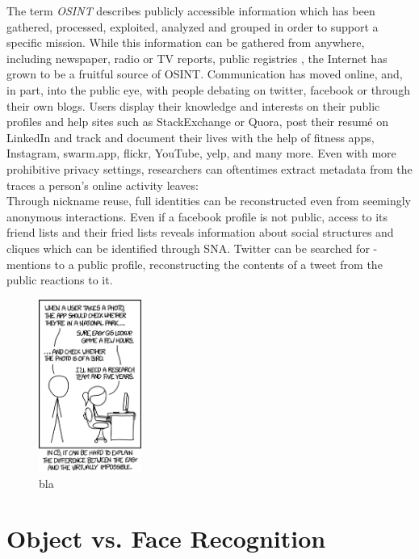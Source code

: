 \documentclass[twoside,a4paper]{article}
\begin{document}
The term \emph{\gls{OSINT}} describes publicly accessible information which has been gathered, processed, exploited, analyzed and grouped in order to support a specific mission.
While this information can be gathered from anywhere, including newspaper, radio or TV reports, public registries , the Internet has grown to be a fruitful source of OSINT. Communication has moved online, and, in part, into the public eye, with people debating on twitter, facebook or through their own blogs. Users display their knowledge and interests on their public profiles and help sites such as StackExchange or Quora, post their resumé on LinkedIn and track and document their lives with the help of fitness apps, Instagram, swarm.app, flickr, YouTube, yelp, and many more. Even with more prohibitive privacy settings, researchers can oftentimes extract metadata from the traces a person's online activity leaves:\\
Through nickname reuse, full identities can be reconstructed even from seemingly anonymous interactions. Even if a facebook profile is not public, access to its friend lists and their fried lists reveals information about social structures and cliques which can be identified through \gls{SNA}. Twitter can be searched for \@-mentions to a public profile, reconstructing the contents of a tweet from the public reactions to it.


\begin{figure}[h!]
\centering
    \includegraphics[width=0.3\textwidth]{images/xkcd}
\caption{bla}
\label{blubb}
\end{figure}

\section{Object vs. Face Recognition}
\label{sec:object_vs_face}






\newpage
\printglossary

\nocite{*}

\end{document}
